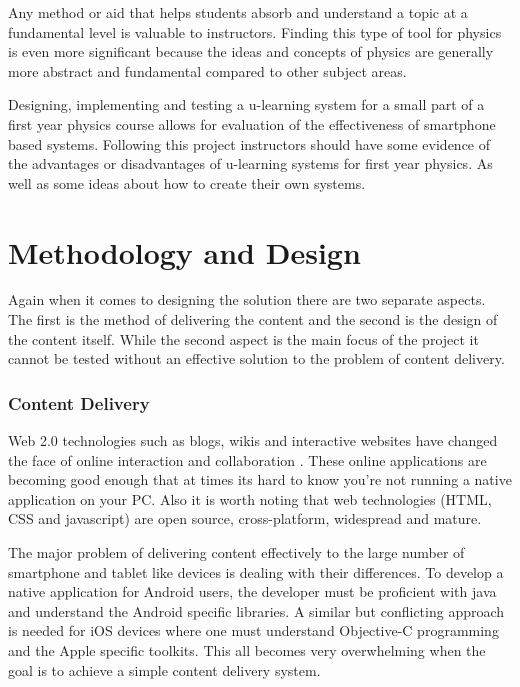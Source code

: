 \documentclass[12pt,a4paper]{article}  %
\begin{document}
Any method or aid that helps students absorb and understand a topic at
a fundamental level is valuable to instructors. Finding this type of
tool for physics is even more significant because the ideas and
concepts of physics are generally more abstract and fundamental
compared to other subject areas. 

Designing, implementing and testing a u-learning system for a small
part of a first year physics course allows for evaluation of the
effectiveness of smartphone based systems. Following this project
instructors should have some evidence of the advantages or
disadvantages of u-learning systems for first year physics. As well as
some ideas about how to create their own systems.

\section*{Methodology and Design}

Again when it comes to designing the solution there are two separate
aspects. The first is the method of delivering the content and the
second is the design of the content itself. While the second aspect is
the main focus of the project it cannot be tested without an effective
solution to the problem of content delivery.


\subsubsection*{Content Delivery}

Web 2.0 technologies such as blogs, wikis and interactive websites
have changed the face of online interaction and collaboration
\cite{procsmart}. These online applications are becoming good enough
that at times its hard to know you're not running a native application
on your PC. Also it is worth noting that web technologies (HTML, CSS
and javascript) are open source, cross-platform, widespread and mature. 

The major problem of delivering content effectively to the large
number of smartphone and tablet like devices is dealing with their
differences.  To develop a native application for Android users, the
developer must be proficient with java and understand the Android
specific libraries. A similar but conflicting approach is needed for
iOS devices where one must understand Objective-C programming and the
Apple specific toolkits. This all becomes very overwhelming when the
goal is to achieve a simple content delivery system. 
\end{document}
